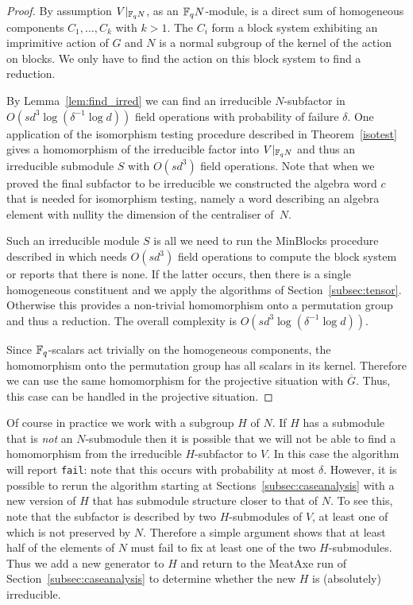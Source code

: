\begin{proof}
By assumption  $V|_{\mathbb{F}_q N}$, as an $\mathbb{F}_q N$-module, is a
direct sum of  homogeneous components $C_1, \ldots, C_k$ with $k > 1$.
The $C_i$ form a block system exhibiting an imprimitive action
of $G$ and $N$ is a normal subgroup of the kernel of the action on
blocks. We only have to find the action on this block system to find a
reduction.

By Lemma~\ref{lem:find_irred} we can find an irreducible $N$-subfactor
in $O(sd^3 \log (\delta^{-1} \log d))$ field operations with probability
of failure $\delta$. One application of the isomorphism testing
procedure described in Theorem~\ref{isotest} gives a homomorphism of the
irreducible factor into $V|_{\mathbb{F}_q N}$ and thus an irreducible submodule
$S$ with $O(sd^3)$ field operations. Note that when we
proved the final subfactor to be irreducible  we constructed the algebra
word $c$ that is needed for isomorphism testing, namely a word 
describing an algebra element with nullity the dimension of
the centraliser of~$N$.

Such an irreducible module $S$ is all we need to run the {\sc
MinBlocks} procedure described in \cite{smashprim} which needs
$O(sd^3)$ field operations to compute the block system or reports
that there is none. If the latter occurs, then there is a single 
homogeneous constituent and we apply the algorithms of 
Section~\ref{subsec:tensor}. Otherwise
this provides a non-trivial homomorphism onto a permutation
group and thus a reduction. The overall complexity 
is $O(sd^3\log(\delta^{-1} \log d))$.

Since $\mathbb{F}_q$-scalars act trivially on the homogeneous
components, the homomorphism onto the permutation group has all
scalars in its kernel. Therefore we can use the same homomorphism
for the projective situation with $\overline{G}$. Thus,  this case
can be handled in the projective situation.
\end{proof}

Of course in practice we work with a subgroup $H$ of $N$. If $H$
has a submodule that is \emph{not} an $N$-submodule then it is
possible that we will not be able to find a homomorphism from the
irreducible $H$-subfactor to $V$. In this case the algorithm will report
{\tt fail}: note that this occurs with probability at most $\delta$. 
However, it is possible to rerun the algorithm starting at
Sections~\ref{subsec:caseanalysis} with a new version of $H$ that has
submodule structure closer to that of $N$. To see this, note that
the subfactor is described by two $H$-submodules of $V$, at least one
of which is not preserved by $N$. Therefore a simple argument shows that at
least half of the elements of $N$ must fail to fix at least one of the
two $H$-submodules. Thus we add a new generator to $H$ and return to the
MeatAxe run of Section~\ref{subsec:caseanalysis} to determine whether
the new $H$ is (absolutely) irreducible.



